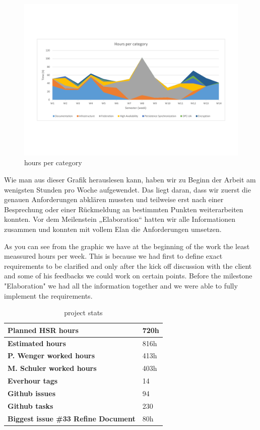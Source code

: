 \begin{figure}[]
	\includegraphics[trim=2cm 5cm 2cm 5.9cm, clip=true, width=\textwidth]{img/project_monitoring_weekly_hours_per_category.pdf}
	\caption{hours per category}
	\label{fig:hours:per:category}
\end{figure}

Wie man aus dieser Grafik herauslesen kann, haben wir zu Beginn der Arbeit 
am wenigsten Stunden pro Woche aufgewendet. Das liegt daran, dass wir zuerst die 
genauen Anforderungen abklären mussten und teilweise erst nach einer Besprechung 
oder einer Rückmeldung an bestimmten Punkten weiterarbeiten konnten. 
Vor dem Meilenstein „Elaboration“ hatten wir alle Informationen zusammen und 
konnten mit vollem Elan die Anforderungen umsetzen.

As you can see from the graphic we have at the beginning of the work
the least meassured hours per week. This is because we had first to define exact requirements to be clarified and only after the kick off discussion
with the client and some of his feedbacks we could work on certain points.
Before the milestone "Elaboration" we had all the information together and
we were able to fully implement the requirements.


\begin{table}[H]
  \centering
  \begin{tabular}{|p{100mm}|p{35mm}|}
    \hline 	\bf Planned HSR hours & 720h \\ \hline
	\bf Estimated hours & 816h \\ \hline
	\bf P. Wenger worked hours & 413h \\ \hline
	\bf M. Schuler worked hours & 403h \\ \hline
	\bf Everhour tags & 14 \\ \hline
	\bf Github issues & 94 \\ \hline
	\bf Github tasks & 230 \\ \hline
	\bf Biggest issue \#33 Refine Document & 80h \\ \hline
  \end{tabular} \\
  \caption{project stats}
  \label{tab:projectstats}
\end{table}


